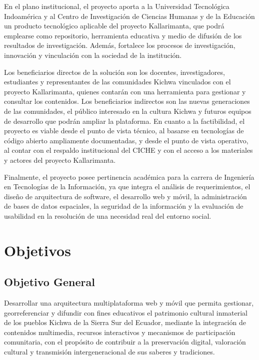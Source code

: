 En el plano institucional, el proyecto aporta a la Universidad Tecnológica Indoamérica y al Centro de Investigación de Ciencias Humanas y de la Educación un producto tecnológico aplicable del proyecto Kallarimanta, que podrá emplearse como repositorio, herramienta educativa y medio de difusión de los resultados de investigación. Además, fortalece los procesos de investigación, innovación y vinculación con la sociedad de la institución.

Los beneficiarios directos de la solución son los docentes, investigadores, estudiantes y representantes de las comunidades Kichwa vinculados con el proyecto Kallarimanta, quienes contarán con una herramienta para gestionar y consultar los contenidos. Los beneficiarios indirectos son las nuevas generaciones de las comunidades, el público interesado en la cultura Kichwa y futuros equipos de desarrollo que podrán ampliar la plataforma. En cuanto a la factibilidad, el proyecto es viable desde el punto de vista técnico, al basarse en tecnologías de código abierto ampliamente documentadas, y desde el punto de vista operativo, al contar con el respaldo institucional del CICHE y con el acceso a los materiales y actores del proyecto Kallarimanta.

Finalmente, el proyecto posee pertinencia académica para la carrera de Ingeniería en Tecnologías de la Información, ya que integra el análisis de requerimientos, el diseño de arquitectura de software, el desarrollo web y móvil, la administración de bases de datos espaciales, la seguridad de la información y la evaluación de usabilidad en la resolución de una necesidad real del entorno social.

\section{Objetivos}
\subsection{Objetivo General}
Desarrollar una arquitectura multiplataforma web y móvil que permita gestionar, georreferenciar y difundir con fines educativos el patrimonio cultural inmaterial de los pueblos Kichwa de la Sierra Sur del Ecuador, mediante la integración de contenidos multimedia, recursos interactivos y mecanismos de participación comunitaria, con el propósito de contribuir a la preservación digital, valoración cultural y transmisión intergeneracional de sus saberes y tradiciones.

